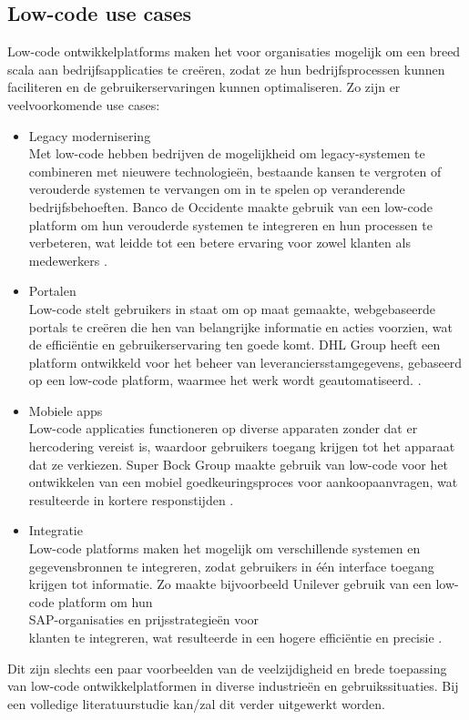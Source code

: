 \subsection{Low-code use cases}
Low-code ontwikkelplatforms maken het voor organisaties mogelijk om een breed scala aan bedrijfsapplicaties te creëren, zodat ze hun bedrijfsprocessen kunnen faciliteren en de gebruikerservaringen kunnen optimaliseren.
Zo zijn er veelvoorkomende use cases:
\begin{itemize}
    \item Legacy modernisering 
    \\
    Met low-code hebben bedrijven de mogelijkheid om legacy-systemen te combineren met nieuwere technologieën, bestaande kansen te vergroten of verouderde systemen te vervangen om in te spelen op veranderende bedrijfsbehoeften. Banco de Occidente maakte gebruik van een low-code platform om hun verouderde systemen te integreren en hun processen te verbeteren, wat leidde tot een betere ervaring voor zowel klanten als medewerkers \autocite{Bunce2024}.
    \item Portalen
    \\
    Low-code stelt gebruikers in staat om op maat gemaakte, webgebaseerde portals te creëren die hen van belangrijke informatie en acties voorzien, wat de efficiëntie en gebruikerservaring ten goede komt. DHL Group heeft een platform ontwikkeld voor het beheer van leveranciersstamgegevens, gebaseerd op een low-code platform, waarmee het werk wordt geautomatiseerd. \autocite{Bunce2024} .
    \item Mobiele apps
    \\
    Low-code applicaties functioneren op diverse apparaten zonder dat er hercodering vereist is, waardoor gebruikers toegang krijgen tot het apparaat dat ze verkiezen. Super Bock Group maakte gebruik van low-code voor het ontwikkelen van een mobiel goedkeuringsproces voor aankoopaanvragen, wat resulteerde in kortere responstijden \autocite{Bunce2024a}.
    \item Integratie
    \\
    Low-code platforms maken het mogelijk om verschillende systemen en gegevensbronnen te integreren, zodat gebruikers in één interface toegang krijgen tot informatie. Zo maakte bijvoorbeeld Unilever gebruik van een low-code platform om hun \\SAP-organisaties en prijsstrategieën voor \\klanten te integreren, wat resulteerde in een hogere efficiëntie en precisie \autocite{Bunce2024}.
\end{itemize}
Dit zijn slechts een paar voorbeelden van de veelzijdigheid en brede toepassing van low-code ontwikkelplatformen in diverse industrieën en gebruikssituaties. Bij een volledige literatuurstudie kan/zal dit verder uitgewerkt worden.

